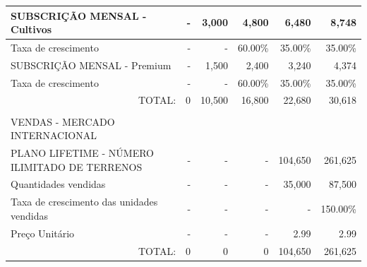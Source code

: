 \documentclass[11pt]{article}
\begin{document}
\begin{adjustbox}{center}
\begin{tabular}{|l|r|r|r|r|r|}
			SUBSCRIÇÃO MENSAL - Cultivos                   &         -                 & 3,000                    & 4,800                    & 6,480                   & 8,748                   \\ \hline
			Taxa de crescimento                            &                  -        &          -                & 60.00\%                  & 35.00\%                  & 35.00\%                  \\ \hline
			SUBSCRIÇÃO MENSAL - Premium                    &              -            & 1,500                     & 2,400                    & 3,240                    & 4,374                    \\ \hline
			Taxa de crescimento                            &               -           &         -                 & 60.00\%                  & 35.00\%                  & 35.00\%                  \\ \hline
			\multicolumn{1}{r}{TOTAL:} & \multicolumn{1}{r}{0} & \multicolumn{1}{r}{10,500} & \multicolumn{1}{r}{16,800} & \multicolumn{1}{r}{22,680} & \multicolumn{1}{r}{30,618} \\
			\multicolumn{1}{l}{} & \multicolumn{1}{l}{} & \multicolumn{1}{l}{} & \multicolumn{1}{l}{} & \multicolumn{1}{l}{} & \multicolumn{1}{l}{} \\
			\multicolumn{1}{l}{VENDAS - MERCADO INTERNACIONAL} & \multicolumn{1}{l}{}& \multicolumn{1}{l}{} & \multicolumn{1}{l}{} & \multicolumn{1}{l}{} & \multicolumn{1}{l}{}\\ \hline
			PLANO LIFETIME - NÚMERO ILIMITADO DE TERRENOS  & -                        & -                   & -                       &  104,650                       & 261,625                         \\ \hline
			Quantidades vendidas                           &        -                  & -                        & -                      & 35,000                       &         87,500                 \\ \hline
			Taxa de crescimento das unidades vendidas      &     -                     & -                   & - & -  & 150.00\%                               \\ \hline
			Preço Unitário                                 &              -            & -                     & -                     & 2.99                     &           2.99               \\ \hline
			\multicolumn{1}{r}{TOTAL:} & \multicolumn{1}{r}{0} & \multicolumn{1}{r}{0} & \multicolumn{1}{r}{0} & \multicolumn{1}{r}{104,650} & \multicolumn{1}{r}{261,625} \\

\end{tabular}
\end{adjustbox}
\end{document}
